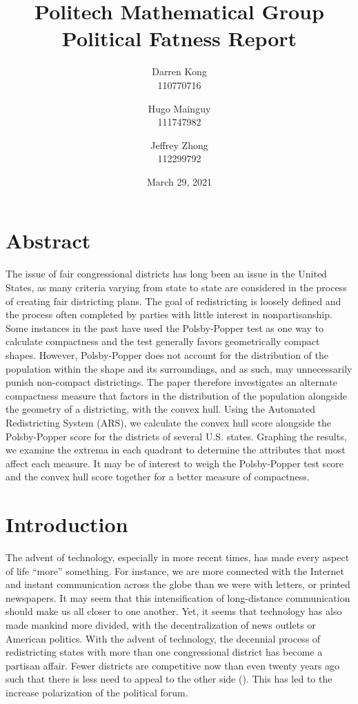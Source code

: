 \documentclass[letterpaper]{article}
\title{
	\textbf{Politech Mathematical Group} \\ 
	\vspace{2ex} 
	Political Fatness Report
	\vspace{2ex}
}
\author{
	Darren Kong \\ 110770716
	\and 
	Hugo Mainguy \\ 111747982
	\and 
	Jeffrey Zhong \\ 112299792
	\vspace{3ex}
}
\date{March 29, 2021}
\begin{document}
\begin{titlepage}
\maketitle
\thispagestyle{empty}
\end{titlepage}

\section{Abstract}
The issue of fair congressional districts has long been an issue in the United States, as many criteria varying from state to state are considered in the process of creating fair districting plans. The goal of redistricting is loosely defined and the process often completed by parties with little interest in nonpartisanship. Some instances in the past have used the Polsby-Popper test as one way to calculate compactness and the test generally favors geometrically compact shapes. However, Polsby-Popper does not account for the distribution of the population within the shape and its surroundings, and as such, may unnecessarily punish non-compact districtings. The paper therefore investigates an alternate compactness measure that factors in the distribution of the population alongside the geometry of a districting, with the convex hull. Using the Automated Redistricting System (ARS), we calculate the convex hull score alongside the Polsby-Popper score for the districts of several U.S. states. Graphing the results, we examine the extrema in each quadrant to determine the attributes that most affect each measure. It may be of interest to weigh the Polsby-Popper test score and the convex hull score together for a better measure of compactness. 


\section{Introduction}

The advent of technology, especially in more recent times, has made every aspect of life “more” something. For instance, we are more connected with the Internet and instant communication across the globe than we were with letters, or printed newspapers. It may seem that this intensification of long-distance communication should make us all closer to one another. Yet, it seems that technology has also made mankind more divided, with the decentralization of news outlets or American politics. With the advent of technology, the decennial process of redistricting states with more than one congressional district has become a partisan affair. Fewer districts are competitive now than even twenty years ago such that there is less need to appeal to the other side (\cite{cook}). This has led to the increase polarization of the political forum.
\end{document}
